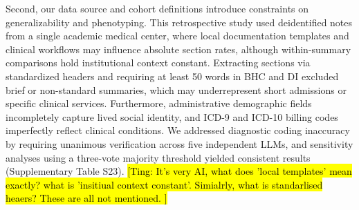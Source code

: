 \documentclass[unnumsec,webpdf,contemporary,large]{oup-authoring-template}
\newcommand{\td}[1]{\sethlcolor{pink}\hl{[Ting: #1]}}
\begin{document}
Second, our data source and cohort definitions introduce constraints on generalizability and phenotyping. This retrospective study used deidentified notes from a single academic medical center, where local documentation templates and clinical workflows may influence absolute section rates, although within-summary comparisons hold institutional context constant. Extracting sections via standardized headers and requiring at least 50 words in BHC and DI excluded brief or non-standard summaries, which may underrepresent short admissions or specific clinical services. Furthermore, administrative demographic fields incompletely capture lived social identity, and ICD-9 and ICD-10 billing codes imperfectly reflect clinical conditions. We addressed diagnostic coding inaccuracy by requiring unanimous verification across five independent LLMs, and sensitivity analyses using a three-vote majority threshold yielded consistent results (Supplementary Table S23).
\td{It's very AI, what does 'local templates' mean exactly? what is 'insitiual context constant'. Simialrly, what is standarlised heaers? These are all not mentioned. }
\end{document}
